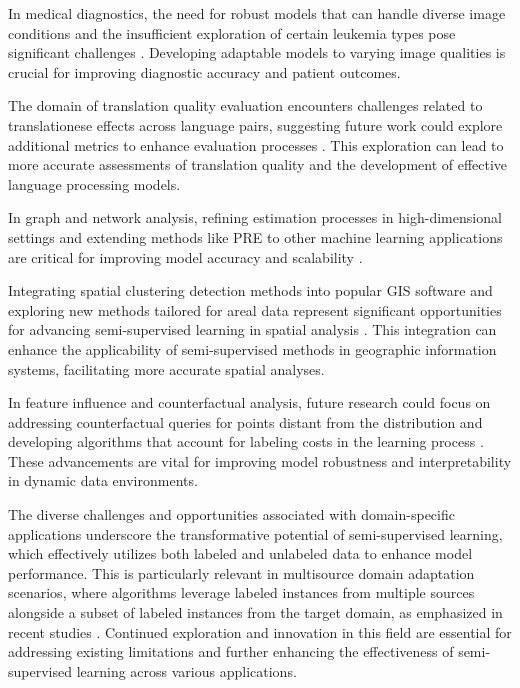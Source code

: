 In medical diagnostics, the need for robust models that can handle diverse image conditions and the insufficient exploration of certain leukemia types pose significant challenges \cite{zolfaghari2023surveyautomateddetectionclassification}. Developing adaptable models to varying image qualities is crucial for improving diagnostic accuracy and patient outcomes.

The domain of translation quality evaluation encounters challenges related to translationese effects across language pairs, suggesting future work could explore additional metrics to enhance evaluation processes \cite{bogoychev2020domaintranslationesenoisesynthetic}. This exploration can lead to more accurate assessments of translation quality and the development of effective language processing models.

In graph and network analysis, refining estimation processes in high-dimensional settings and extending methods like PRE to other machine learning applications are critical for improving model accuracy and scalability \cite{liu2020posteriorratioestimationlatent}.

Integrating spatial clustering detection methods into popular GIS software and exploring new methods tailored for areal data represent significant opportunities for advancing semi-supervised learning in spatial analysis \cite{vidanapathirana2022clusterdetectioncapabilitiesaverage}. This integration can enhance the applicability of semi-supervised methods in geographic information systems, facilitating more accurate spatial analyses.

In feature influence and counterfactual analysis, future research could focus on addressing counterfactual queries for points distant from the distribution and developing algorithms that account for labeling costs in the learning process \cite{sen2018supervisingfeatureinfluence}. These advancements are vital for improving model robustness and interpretability in dynamic data environments.

The diverse challenges and opportunities associated with domain-specific applications underscore the transformative potential of semi-supervised learning, which effectively utilizes both labeled and unlabeled data to enhance model performance. This is particularly relevant in multisource domain adaptation scenarios, where algorithms leverage labeled instances from multiple sources alongside a subset of labeled instances from the target domain, as emphasized in recent studies \cite{jang2024visualdeltageneratorlarge,zhao2017multiplesourcedomainadaptation}. Continued exploration and innovation in this field are essential for addressing existing limitations and further enhancing the effectiveness of semi-supervised learning across various applications.








